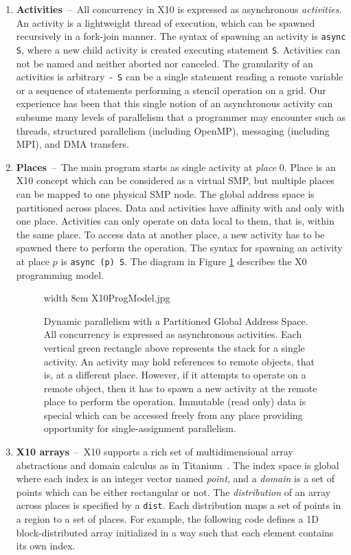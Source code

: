 \begin{enumerate}
\item{\bf Activities}~--~All concurrency in X10 is expressed as asynchronous {\em activities}. An activity is a lightweight thread of execution, which can be spawned recursively in a fork-join manner. The syntax of spawning an activity is {\tt async S}, where a new child activity is created executing statement {\tt S}. Activities can not be named and neither aborted nor canceled. The granularity of an activities is arbitrary~-~{\tt S} can be a single statement reading a remote variable or a sequence of statements performing a stencil operation on a grid.  Our experience has been that this single notion of an asynchronous activity can subsume many levels of parallelism that  a programmer may encounter such as threads, structured parallelism (including OpenMP), messaging (including MPI), and DMA transfers.  
\item{\bf Places}~--~The main program starts as single activity at {\em place} 0. Place is an X10 concept which can be considered as a virtual SMP, but multiple places can be mapped to one physical SMP node. The global address space is partitioned across places. Data and activities have affinity with and only with one place. Activities can only operate on data local to them, that is, within the same place. To access data at another place, a new activity has to be spawned there to perform the operation. The syntax for spawning an activity at place $p$ is {\tt async (p) S}. The diagram in Figure \ref{fig 1} describes the X0 programming model.

\begin{figure}
        \begin{center}
        \pdfimage width 8cm {X10ProgModel.jpg}
        \caption{Dynamic parallelism with a Partitioned Global Address Space. All concurrency is expressed as asynchronous activities.  Each vertical green rectangle above represents the stack for a single activity. An activity may hold references to remote objects, that is, at a different place.  However, if it attempts to operate on a remote object, then it has to spawn a new activity at the remote place to perform the operation.  Immutable (read only) data is special which can be accessed freely from any place providing opportunity for single-assignment parallelism.} \label{fig 1}
        \end{center}
\end{figure}


\item{\bf X10 arrays}~--~X10 supports a rich set of multidimensional array abstractions and domain calculus as in Titanium~\cite{TitaniumRef}. The index space is global where each index is an integer vector named {\em point}, and a {\em domain} is a set of points which can be either rectangular or not. The {\em distribution} of an array across places is specified by a {\tt dist}. Each distribution maps a set of points in a region to a set of places. For example, the following code defines a 1D block-distributed array initialized in a way such that each element contains its own index.


\end{enumerate}
